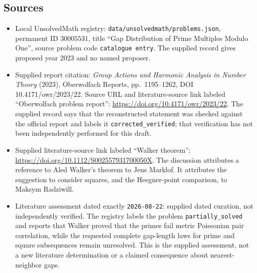 \documentclass[11pt]{article}
\begin{document}
\subsection{Sources}
\begin{itemize}
\item Local UnsolvedMath registry: \texttt{data/unsolvedmath/problems.json}, permanent ID \(30005531\), title ``Gap Distribution of Prime Multiples Modulo One'', source problem code \texttt{catalogue entry}. The supplied record gives proposed year 2023 and no named proposer.
\item Supplied report citation: \emph{Group Actions and Harmonic Analysis in Number Theory} (2023), Oberwolfach Reports, pp.\ 1195--1262, DOI 10.4171/owr/2023/22. Source URL and literature-source link labeled ``Oberwolfach problem report'': \url{https://doi.org/10.4171/owr/2023/22}. The supplied record says that the reconstructed statement was checked against the official report and labels it \texttt{corrected\_verified}; that verification has not been independently performed for this draft.
\item Supplied literature-source link labeled ``Walker theorem'': \url{https://doi.org/10.1112/S002557931700050X}. The discussion attributes a reference to Aled Walker's theorem to Jens Marklof. It attributes the suggestion to consider squares, and the Heegner-point comparison, to Maksym Radziwill.
\item Literature assessment dated exactly \texttt{2026-08-22}: supplied dated curation, not independently verified. The registry labels the problem \texttt{partially\_solved} and reports that Walker proved that the primes fail metric Poissonian pair correlation, while the requested complete gap-length laws for prime and square subsequences remain unresolved. This is the supplied assessment, not a new literature determination or a claimed consequence about nearest-neighbor gaps.
\end{itemize}
\end{document}
